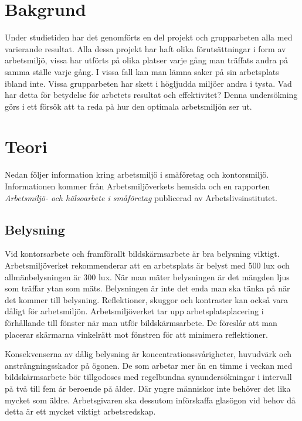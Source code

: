 \section{Bakgrund}
\label{sec:background-hampus}

Under studietiden har det genomförts en del projekt och grupparbeten alla med varierande resultat. Alla dessa projekt har haft olika förutsättningar i form av arbetsmiljö, vissa har utförts på olika platser varje gång man träffats andra på samma ställe varje gång. I vissa fall kan man lämna saker på sin arbetsplats ibland inte. Vissa grupparbeten har skett i högljudda miljöer andra i tysta. Vad har detta för betydelse för arbetets resultat och effektivitet? Denna undersökning görs i ett försök att ta reda på hur den optimala arbetsmiljön ser ut. 

\section{Teori}
\label{sec:theory-hampus}
Nedan följer information kring arbetsmiljö i småföretag och kontorsmiljö. Informationen kommer från Arbetsmiljöverkets hemsida och en rapporten \textit{Arbetsmiljö- och hälsoarbete i småföretag} publicerad av Arbetslivsinstitutet.

\subsection{Belysning}
Vid kontorsarbete och framförallt bildskärmsarbete är bra belysning viktigt. Arbetsmiljöverket rekommenderar att en arbetsplats är belyst med 500 lux och allmänbelysningen är 300 lux. När man mäter belysningen är det mängden ljus som träffar ytan som mäts. Belysningen är inte det enda man ska tänka på när det kommer till belysning. Reflektioner, skuggor och kontraster kan också vara dåligt för arbetsmiljön. Arbetsmiljöverket tar upp arbetsplatsplacering i förhållande till fönster när man utför bildskärmsarbete. De föreslår att man placerar skärmarna vinkelrätt mot fönstren för att minimera reflektioner. \cite{AVLjus}\cite{AVDator}

Konsekvenserna av dålig belysning är koncentrationssvårigheter, huvudvärk och ansträngningsskador på ögonen. De som arbetar mer än en timme i veckan med bildskärmsarbete bör tillgodoses med regelbundna synundersökningar i intervall på två till fem år beroende på ålder. Där yngre människor inte behöver det lika mycket som äldre. Arbetsgivaren ska dessutom införskaffa glasögon vid behov då detta är ett mycket viktigt arbetsredskap.\cite{AVLjus}

